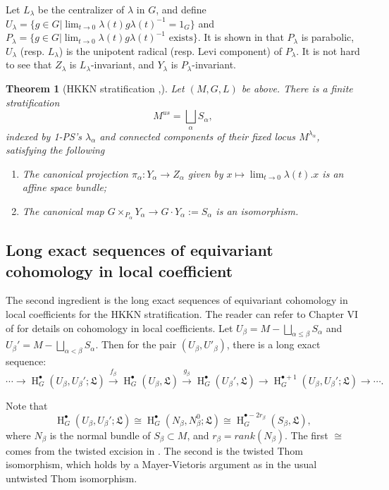 \documentclass[12pt]{amsart}
\newtheorem{theorem}{Theorem}[section]
\theoremstyle{definition}
\theoremstyle{remark}
\numberwithin{equation}{section}
\newcommand{\arw}{\longrightarrow}
\newcommand{\Hdot}{\operatorname{H}}
\begin{document}
Let $L_{\lambda}$ be the centralizer of $\lambda$ in $G$, and define $U_{\lambda}=\{g\in G| \lim_{t\to 0}\lambda(t)g\lambda(t)^{-1}=1_G\}$ and $P_{\lambda}=\{g\in G| \lim_{t\to 0}\lambda(t)g\lambda(t)^{-1}\text{ exists}\}$. It is shown in \cite{mumford1994geometric} that $P_{\lambda}$ is parabolic, $U_{\lambda}$ (resp. $L_{\lambda}$) is the unipotent radical (resp. Levi component) of $P_{\lambda}$. It is not hard to see that  $Z_{\lambda}$ is $L_{\lambda}$-invariant, and $Y_{\lambda}$ is $P_{\lambda}$-invariant. 
\begin{theorem}[HKKN stratification \cite{kirwan1984cohomology},\cite{halpern2015derived}]\label{thm: hkkn} Let $(M, G, L)$ be above. There is a finite stratification  
$$M^{us}=\bigsqcup_{\alpha} S_{\alpha},$$ indexed by 1-PS's $\lambda_{\alpha}$ and connected components of their fixed locus $M^{\lambda_{\alpha}}$, satisfying the following
\begin{enumerate}
    \item The canonical projection $\pi_{\alpha}: Y_{\alpha}\arw Z_{\alpha}$ given by $x\mapsto \lim_{t\to 0}\lambda(t).x$ is an affine space bundle;
    \item The canonical map $G\times_{P_{\alpha}}Y_{\alpha}\arw G\cdot Y_{\alpha}:=S_{\alpha}$ is an isomorphism.
\end{enumerate}
\end{theorem}
\subsection{Long exact sequences of equivariant cohomology in local coefficient}\label{app:longexact}
The second ingredient is the long exact sequences of equivariant cohomology in local coefficients for the HKKN stratification. The reader can refer to 
Chapter VI of \cite{whitehead2012elements} for details on cohomology in local coefficients. Let $U_{\beta}=M-\bigsqcup_{\alpha\leq \beta} S_{\alpha}$ and $U_{\beta}'=M-\bigsqcup_{\alpha< \beta} S_{\alpha}$. Then for the pair $(U_{\beta}, U'_{\beta})$, there is a long exact sequence:
$$\cdots\arw\Hdot^{\bullet}_G(U_{\beta}, U_{\beta}';\mathfrak{L})\xrightarrow{f_{\beta}}\Hdot^{\bullet}_G(U_{\beta},\mathfrak{L} )\xrightarrow{g_{\beta}} \Hdot^{\bullet}_G(U_{\beta}',\mathfrak{L})\arw \Hdot^{\bullet+1}_G(U_{\beta}, U_{\beta}';\mathfrak{L})\arw\cdots.$$

Note that 
$$\Hdot^{\bullet}_G(U_{\beta}, U_{\beta}';\mathfrak{L})\cong \Hdot^{\bullet}_G(N_{\beta}, N_{\beta}^0;\mathfrak{L})\cong \Hdot^{\bullet-2r_{\beta}}_{G}(S_{\beta}, \mathfrak{L}),$$ where $N_{\beta}$ is the normal bundle of $S_{\beta}\subset M$, and $r_{\beta}=rank (N_{\beta})$. The first $\cong$ comes from the twisted excision in \cite{whitehead2012elements}. The second is the twisted Thom isomorphism, which holds by a Mayer-Vietoris argument as in the usual untwisted Thom isomorphism. 
\end{document}
